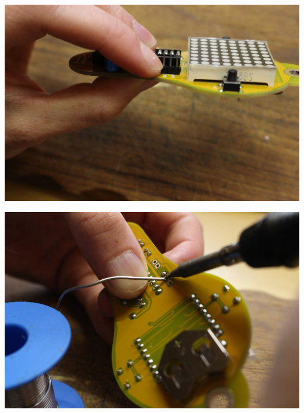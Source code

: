 \documentclass{article}
\begin{document}
\begin{minipage}[b]{0.5\textwidth}
	\includegraphics[width=\textwidth]{Bilder/IMG_5606.JPG}
\end{minipage}
\begin{minipage}[b]{0.5\textwidth}
	\includegraphics[width=\textwidth]{Bilder/IMG_5608.JPG}
\end{minipage}

\vspace{0.5cm}
\end{document}
